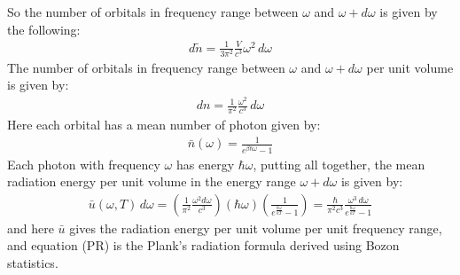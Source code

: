 \documentclass[11pt,oneside]{book}
\theoremstyle{break}
\theoremstyle{break}
\newcommand{\that}[1]{\widetilde{#1}}
\begin{document}
So the number of orbitals in frequency range between $\omega$ and $\omega+d\omega$ is given by the following:
\begin{align*}
d\that{n} = \frac{1}{3\pi^2} \frac{V}{c^3} \omega^2 \, d\omega
\end{align*}
The number of orbitals in frequency range between $\omega$ and $\omega+d\omega$ per unit volume is given by:
\begin{align*}
dn = \frac{1}{\pi^2}\frac{\omega^2}{c^3}\, d\omega
\end{align*}
Here each orbital has a mean number of photon given by:
\begin{align*}
\bar{n}(\omega) = \frac{1}{e^{\beta \hbar\omega} - 1}
\end{align*}
Each photon with frequency $\omega$ has energy $\hbar \omega$, putting all together, the mean radiation energy per unit volume in the energy range $\omega +d\omega$ is given by:
\begin{align*}
\bar{u}(\omega, T) \, d\omega = \left( \frac{1}{\pi^2}\frac{\omega^2 d\omega}{c^3}\right) (\hbar \omega)\left(\frac{1}{e^{\frac{\hbar \omega}{kT}} - 1 } \right)=\frac{\hbar}{\pi^2 c^3} \frac{\omega^3 \, d\omega}{e^{\frac{\hbar \omega}{kT}}-1} \tag{PR}
\end{align*}
and here $\bar{u}$ gives the radiation energy per unit volume per unit frequency range, and equation (PR) is the Plank's radiation formula derived using Bozon statistics.\\


\end{document}
